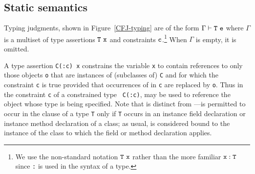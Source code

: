 \subsection{Static semantics}

Typing judgments, shown in Figure~\ref{CFJ-typing}
are of the form $\Gamma \vdash {\tt T}\ {\tt e}$
where $\Gamma$ is a multiset of type assertions ${\tt T}\ {\tt x}$
and constraints ${\tt c}$.\footnote{We use the non-standard
notation ${\tt T\ x}$
rather than the more familiar ${\tt x} : {\tt T}$ since {\tt :}
is
used in the syntax of a type.}
When $\Gamma$ is empty, it is
omitted. 

A type assertion {\tt C(:c) x} constrains the variable {\tt x} to
contain references to only those objects {\tt o} that are instances of
(subclasses of) {\tt C} and for which the constraint {\tt c} is true
provided that occurrences of \self in {\tt c} are replaced by
{\tt o}. Thus in the constraint {\tt c} of a constrained type {\tt
C(:c)}, \self may be used to reference the object whose type is
being specified. Note that \self is distinct from
\this---\this is permitted to occur in the clause of
a type {\tt T} only
if {\tt T} occurs in an instance field declaration or instance method
declaration of a class; as usual, \this{} is considered bound to the
instance of the class to which the field or method declaration
applies.

\renewcommand\andalso\quad

